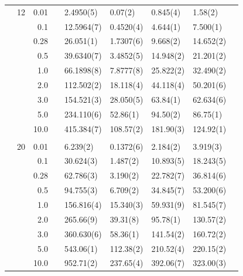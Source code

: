 \begin{table}[H]
\begin{tabularx}{\textwidth}{R{1cm}rrcR{2.3cm}R{2.3cm}R{2.3cm}R{2.3cm}R{1cm}}
		&12 & 0.01 && 2.4950(5) & 0.07(2) & 0.845(4) & 1.58(2) \\
		&& 0.1 && 12.5964(7) & 0.4520(4) & 4.644(1) & 7.500(1) \\
		&& 0.28 && 26.051(1) & 1.7307(6) & 9.668(2) & 14.652(2) \\
		&& 0.5 && 39.6340(7) & 3.4852(5) & 14.948(2) & 21.201(2) \\
		&& 1.0 && 66.1898(8) & 7.8777(8) & 25.822(2) & 32.490(2) \\
		&& 2.0 && 112.502(2) & 18.118(4) & 44.118(4) & 50.201(6) \\
		&& 3.0 && 154.521(3) & 28.050(5) & 63.84(1) & 62.634(6) \\ 
		&& 5.0 && 234.110(6) & 52.86(1) & 94.50(2) & 86.75(1) \\
		&& 10.0 && 415.384(7) & 108.57(2) & 181.90(3) & 124.92(1) \\
		\hdashline \\
		
		&20 & 0.01 && 6.239(2) & 0.1372(6) & 2.184(2) & 3.919(3) \\
		&& 0.1 && 30.624(3) & 1.487(2) & 10.893(5) & 18.243(5) \\
		&& 0.28 && 62.786(3) & 3.190(2) & 22.782(7) & 36.814(6) \\
		&& 0.5 && 94.755(3) & 6.709(2) & 34.845(7) & 53.200(6) \\
		&& 1.0 && 156.816(4) & 15.340(3) & 59.931(9) & 81.545(7) \\
		&& 2.0 && 265.66(9) & 39.31(8) & 95.78(1) & 130.57(2) \\
		&& 3.0 && 360.630(6) & 58.36(1) & 141.54(2) & 160.72(2) \\ 
		&& 5.0 && 543.06(1) & 112.38(2) & 210.52(4) & 220.15(2) \\
		&& 10.0 && 952.71(2) & 237.65(4) & 392.06(7) & 323.00(3) \\
		\hline\hline
	\end{tabularx}
\end{table}

